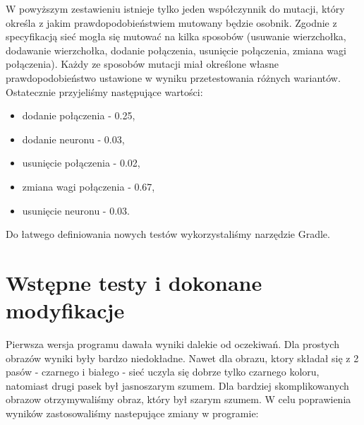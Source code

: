 \documentclass[12pt,a4paper,oneside]{article}
\begin{document}
W powyższym zestawieniu istnieje tylko jeden współczynnik do mutacji, który określa z jakim prawdopodobieństwiem mutowany będzie osobnik. Zgodnie z specyfikacją sieć mogła się mutować na kilka sposobów (usuwanie wierzchołka, dodawanie wierzchołka, dodanie połączenia, usunięcie połączenia, zmiana wagi połączenia). Każdy ze sposobów mutacji miał określone własne prawdopodobieństwo ustawione w wyniku przetestowania różnych wariantów. Ostatecznie przyjeliśmy następujące wartości:
\begin{itemize}
\item dodanie połączenia - 0.25,
\item dodanie neuronu - 0.03,
\item usunięcie połączenia - 0.02,
\item zmiana wagi połączenia - 0.67,
\item usunięcie neuronu - 0.03.
\end{itemize}

Do łatwego definiowania nowych testów wykorzystaliśmy narzędzie Gradle.

\section{Wstępne testy i dokonane modyfikacje}
Pierwsza wersja programu dawała wyniki dalekie od oczekiwań. Dla prostych obrazów wyniki były bardzo niedokładne. Nawet dla obrazu, ktory składał się z 2 pasów - czarnego i białego - sieć uczyla się dobrze tylko czarnego koloru, natomiast drugi pasek był jasnoszarym szumem. Dla bardziej skomplikowanych obrazow otrzymywaliśmy obraz, który był szarym szumem. W celu poprawienia wyników zastosowaliśmy nastepujące zmiany w programie:
\end{document}
